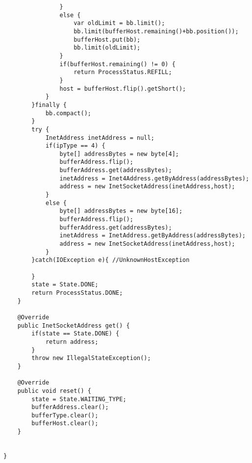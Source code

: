 \documentclass[a4paper,titlepage]{report}
\begin{document}
\begin{lstlisting}
				}
				else {
					var oldLimit = bb.limit();
					bb.limit(bufferHost.remaining()+bb.position());
					bufferHost.put(bb);
					bb.limit(oldLimit);
				}
				if(bufferHost.remaining() != 0) {
					return ProcessStatus.REFILL;
				}
				host = bufferHost.flip().getShort();
			}
		}finally {
			bb.compact();
		}
		try {
			InetAddress inetAddress = null;
			if(ipType == 4) {
				byte[] addressBytes = new byte[4];
				bufferAddress.flip();
				bufferAddress.get(addressBytes);
				inetAddress = Inet4Address.getByAddress(addressBytes);
				address = new InetSocketAddress(inetAddress,host);
			}
			else {
				byte[] addressBytes = new byte[16];
				bufferAddress.flip();
				bufferAddress.get(addressBytes);
				inetAddress = InetAddress.getByAddress(addressBytes);
				address = new InetSocketAddress(inetAddress,host);
			}
		}catch(IOException e){ //UnknownHostException
			
		}
		state = State.DONE;
		return ProcessStatus.DONE;
	}

	@Override
	public InetSocketAddress get() {
		if(state == State.DONE) {
			return address;
		}
		throw new IllegalStateException();
	}

	@Override
	public void reset() {
		state = State.WAITING_TYPE;
		bufferAddress.clear();
		bufferType.clear();
		bufferHost.clear();
	}

	
}
\end{lstlisting}
\pagebreak
\end{document}
